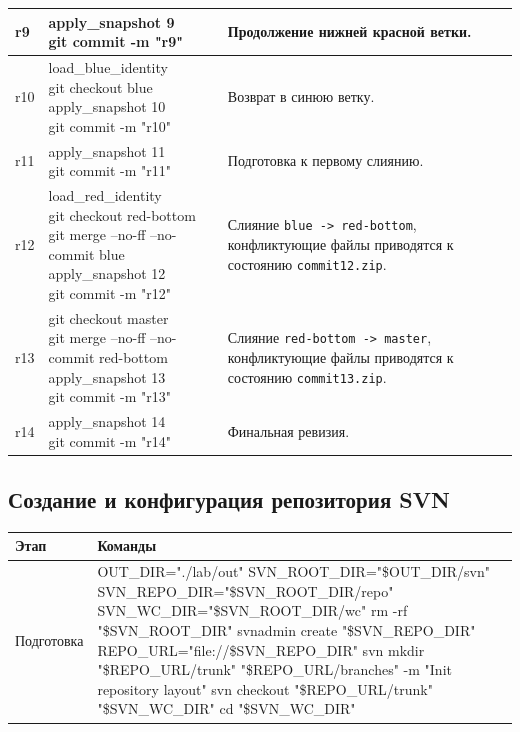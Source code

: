 \documentclass[12pt]{article}
\newcommand{\cmdcell}[1]{\parbox[t]{\linewidth}{\ttfamily\small\raggedright\strut #1\strut}}
\begin{document}
\begin{xltabular}{\linewidth}{|L{0.10\textwidth}|K|M|}
\hline
r9 &
\cmdcell{apply\_snapshot 9\\
git commit -m "r9"} &
Продолжение нижней красной ветки. \\
\hline
r10 &
\cmdcell{load\_blue\_identity\\
git checkout blue\\
apply\_snapshot 10\\
git commit -m "r10"} &
Возврат в синюю ветку. \\
\hline
r11 &
\cmdcell{apply\_snapshot 11\\
git commit -m "r11"} &
Подготовка к первому слиянию. \\
\hline
r12 &
\cmdcell{load\_red\_identity\\
git checkout red-bottom\\
git merge --no-ff --no-commit blue\\
apply\_snapshot 12\\
git commit -m "r12"} &
Слияние \texttt{blue -> red-bottom}, конфликтующие файлы приводятся к состоянию \texttt{commit12.zip}. \\
\hline
r13 &
\cmdcell{git checkout master\\
git merge --no-ff --no-commit red-bottom\\
apply\_snapshot 13\\
git commit -m "r13"} &
Слияние \texttt{red-bottom -> master}, конфликтующие файлы приводятся к состоянию \texttt{commit13.zip}. \\
\hline
r14 &
\cmdcell{apply\_snapshot 14\\
git commit -m "r14"} &
Финальная ревизия. \\
\hline
\end{xltabular}

\subsection{Создание и конфигурация репозитория SVN}

\noindent
\begin{tabularx}{\textwidth}{|L{0.18\textwidth}|Y|}
\hline
{}
\textbf{Этап} & \textbf{Команды} \\
\hline
Подготовка &
\cmdcell{OUT\_DIR="./lab/out"\\
SVN\_ROOT\_DIR="\$OUT\_DIR/svn"\\
SVN\_REPO\_DIR="\$SVN\_ROOT\_DIR/repo"\\
SVN\_WC\_DIR="\$SVN\_ROOT\_DIR/wc"\\
rm -rf "\$SVN\_ROOT\_DIR"\\
svnadmin create "\$SVN\_REPO\_DIR"\\
REPO\_URL="file://\$SVN\_REPO\_DIR"\\
svn mkdir "\$REPO\_URL/trunk" "\$REPO\_URL/branches"\\
-m "Init repository layout"\\
svn checkout "\$REPO\_URL/trunk" "\$SVN\_WC\_DIR"\\
cd "\$SVN\_WC\_DIR"} \\
\hline
\end{tabularx}
\end{document}
